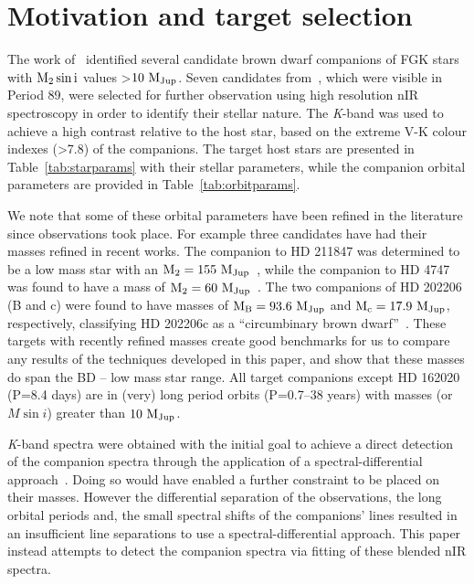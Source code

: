 \documentclass[fleqn,usenatbib]{mnras}
\newcommand*\bl{\color{blue}}
\begin{document}
\section{Motivation and target selection}
\label{sec:motivation}
The work of~\citet{sahlmann_search_2011} identified several candidate brown dwarf companions of FGK stars with \(\rm M_2 \sin{i}\) values >\(\rm 10~M_{Jup}\). Seven candidates {from~\citet{sahlmann_search_2011}, which were visible in Period 89, were selected for further} observation using high resolution nIR spectroscopy in order to identify their stellar nature. The \textit{K}-band was used to achieve a high contrast relative to the host star, {\bl based on the} extreme V-K colour indexes (>7.8) {\bl of the companions}. The target host stars are presented in Table~\ref{tab:starparams} with their stellar parameters, while the companion orbital parameters are provided in Table~\ref{tab:orbitparams}.


We note that some of these orbital parameters have been refined in the literature since observations took place. For example three candidates have had their masses refined in recent works. The companion to {HD 211847} was determined to be a low mass star with an \(\rm M_2=155~M_{Jup}\)~\citep{moutou_eccentricity_2017}, while the companion to {HD 4747} was found to have a mass of \(\rm M_2=60~M_{Jup}\)~\citep{crepp_trends_2016}. The two companions of {HD 202206} (B and c) were found to have masses of \(\rm M_B =93.6~M_{Jup}\) and \(\rm M_c = 17.9~M_{Jup}\), respectively, classifying {HD 202206}c as a ``circumbinary brown dwarf''~\citep{benedict_hd_2017}. These targets with recently refined masses create good benchmarks for us to compare any results of the techniques developed in this paper, and show that these masses do span the BD -- low mass star range. All target companions except {HD 162020} (P=8.4 days) are in (very) long period orbits (P=0.7--38 years) with masses (or \(M\sin{i}\)) greater than \(\rm 10~M_{Jup}\).

\textit{K}-band spectra were obtained with the initial goal to achieve a direct detection of the companion spectra through the application of a spectral-differential approach~\citep[e.g.][]{ferluga_separating_1997, kostogryz_spectral_2013}. Doing so would have enabled a further constraint to be placed on their masses.  However the differential separation of the observations, the long orbital periods and, the small spectral shifts of the companions' lines resulted in an insufficient line separations to use a spectral-differential approach. This paper instead attempts to detect the companion spectra via fitting of these blended nIR spectra.
\end{document}
